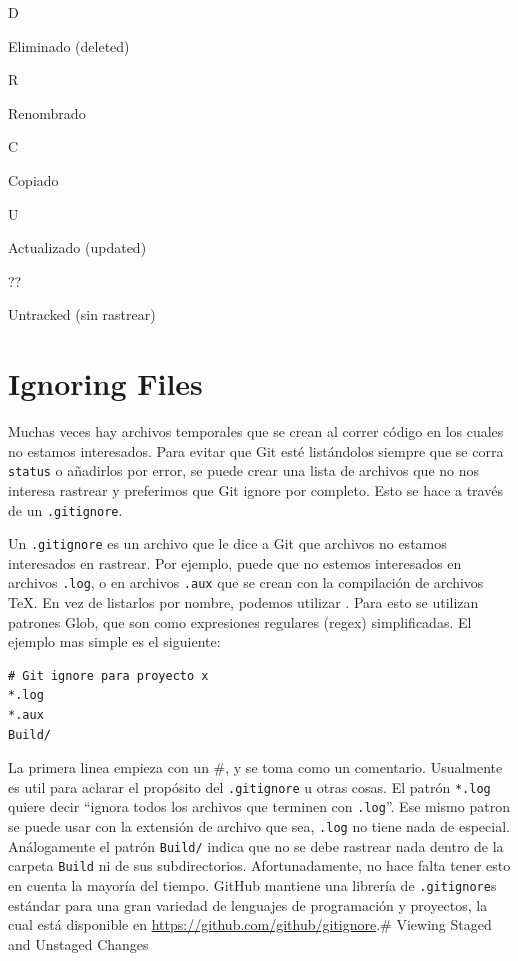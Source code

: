 \documentclass[spanish, 12pt, a4paper]{article}
\begin{document}
D

Eliminado (deleted)

R

Renombrado

C

Copiado

U

Actualizado (updated)

??

Untracked (sin rastrear)

\section{Ignoring Files}

Muchas veces hay archivos temporales que se crean al correr código en
los cuales no estamos interesados. Para evitar que Git esté listándolos
siempre que se corra \passthrough{\lstinline!status!} o añadirlos por
error, se puede crear una lista de archivos que no nos interesa rastrear
y preferimos que Git ignore por completo. Esto se hace a través de un
\passthrough{\lstinline!.gitignore!}.

Un \passthrough{\lstinline!.gitignore!} es un archivo que le dice a Git
que archivos no estamos interesados en rastrear. Por ejemplo, puede que
no estemos interesados en archivos \passthrough{\lstinline!.log!}, o en
archivos \passthrough{\lstinline!.aux!} que se crean con la compilación
de archivos TeX. En vez de listarlos por nombre, podemos utilizar . Para
esto se utilizan patrones Glob, que son como expresiones regulares
(regex) simplificadas. El ejemplo mas simple es el siguiente:

\begin{lstlisting}
# Git ignore para proyecto x
*.log
*.aux
Build/
\end{lstlisting}

La primera linea empieza con un \#, y se toma como un comentario.
Usualmente es util para aclarar el propósito del
\passthrough{\lstinline!.gitignore!} u otras cosas. El patrón
\passthrough{\lstinline!*.log!} quiere decir ``ignora todos los archivos
que terminen con \passthrough{\lstinline!.log!}''. Ese mismo patron se
puede usar con la extensión de archivo que sea,
\passthrough{\lstinline!.log!} no tiene nada de especial. Análogamente
el patrón \passthrough{\lstinline!Build/!} indica que no se debe
rastrear nada dentro de la carpeta \passthrough{\lstinline!Build!} ni de
sus subdirectorios. Afortunadamente, no hace falta tener esto en cuenta
la mayoría del tiempo. GitHub mantiene una librería de
\passthrough{\lstinline!.gitignore!}s estándar para una gran variedad de
lenguajes de programación y proyectos, la cual está disponible en
\url{https://github.com/github/gitignore}.\# Viewing Staged and Unstaged
Changes
\end{document}
